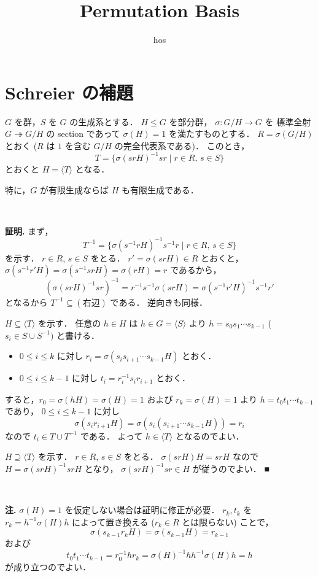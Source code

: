 \documentclass{jsarticle}
\title{Permutation Basis}
\author{hos}
\def\<#1>{\langle #1 \rangle}
\begin{document}
\maketitle

\section{Schreier の補題}
$G$ を群，$S$ を $G$ の生成系とする．
$H \le G$ を部分群，
$\sigma\colon G/H \to G$ を
標準全射 $G \twoheadrightarrow G/H$ の section であって
$\sigma(H) = 1$ を満たすものとする．
$R = \sigma(G/H)$ とおく ($R$ は $1$ を含む $G/H$ の完全代表系である)．
このとき，
\[
  T = \{ \sigma(srH)^{-1} sr \mid r \in R,\, s \in S \}
\]
とおくと $H = \<T>$ となる．

特に，$G$ が有限生成ならば $H$ も有限生成である．

\

\noindent\textbf{証明.}
まず，
\[
  T^{-1} = \{ \sigma(s^{-1}rH)^{-1} s^{-1}r \mid r \in R,\, s \in S \}
\]
を示す．
$r \in R$, $s \in S$ をとる．
$r' = \sigma(srH) \in R$ とおくと，
$\sigma(s^{-1}r'H) = \sigma(s^{-1}srH) = \sigma(rH) = r$ であるから，
\[
  (\sigma(srH)^{-1} sr)^{-1}
  = r^{-1}s^{-1} \sigma(srH)
  = \sigma(s^{-1}r'H)^{-1} s^{-1}r'
\]
となるから $T^{-1} \subseteq (右辺)$ である．
逆向きも同様．

$H \subseteq \<T>$ を示す．
任意の $h \in H$ は $h \in G = \<S>$ より
$h = s_0 s_1 \cdots s_{k-1}$ ($s_i \in S \cup S^{-1})$ と書ける．
\begin{itemize}
  \item $0 \le i \le k$ に対し $r_i = \sigma(s_i s_{i+1} \cdots s_{k-1} H)$ とおく．
  \item $0 \le i \le k-1$ に対し $t_i = r_i^{-1} s_i r_{i+1}$ とおく．
\end{itemize}
すると，$r_0 = \sigma(hH) = \sigma(H) = 1$ および $r_k = \sigma(H) = 1$ より
$h = t_0 t_1 \cdots t_{k-1}$ であり，
$0 \le i \le k-1$ に対し
\[
  \sigma(s_i r_{i+1} H) = \sigma(s_i (s_{i+1} \cdots s_{k-1} H)) = r_i
\]
なので $t_i \in T \cup T^{-1}$ である．
よって $h \in \<T>$ となるのでよい．

$H \supseteq \<T>$ を示す．
$r \in R$, $s \in S$ をとる．
$\sigma(srH) H = srH$ なので
$H = \sigma(srH)^{-1} srH$ となり，
$\sigma(srH)^{-1} sr \in H$ が従うのでよい．
\hfill ■

\

\noindent\textbf{注.}
$\sigma(H) = 1$ を仮定しない場合は証明に修正が必要．
$r_k, t_k$ を $r_k = h^{-1} \sigma(H) h$ によって置き換える
($r_k \in R$ とは限らない) ことで，
\[
  \sigma(s_{k-1} r_k H)
  = \sigma(s_{k-1} H)
  = r_{k-1}
\]
および
\[
  t_0 t_1 \cdots t_{k-1}
  = r_0^{-1} h r_k
  = \sigma(H)^{-1} h h^{-1} \sigma(H) h
  = h
\]
が成り立つのでよい．
\end{document}
